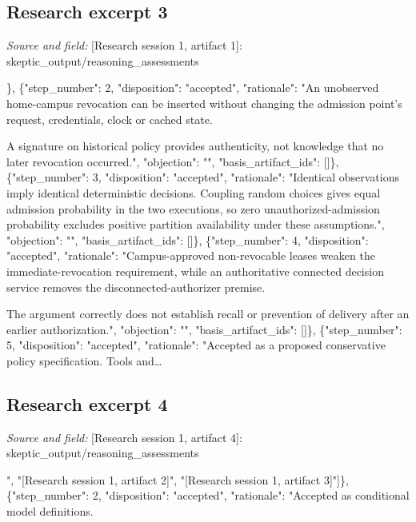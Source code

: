 \documentclass[11pt]{article}
\begin{document}
\subsection{Research excerpt 3}
\textit{Source and field: }[Research session 1, artifact 1]: skeptic\_output/reasoning\_assessments\par
[\{"step\_number": 1, "disposition": "accepted", "rationale": "Accepted as the exact conditional model, not as established university policy. It explicitly excludes alternative information channels and previously committed request-specific authorization, and defines safety and availability sufficiently for the argument.", "objection": "", "basis\_artifact\_ids": []\}, \{"step\_number": 2, "disposition": "accepted", "rationale": "An unobserved home-campus revocation can be inserted without changing the admission point's request, credentials, clock or cached state.

A signature on historical policy provides authenticity, not knowledge that no later revocation occurred.", "objection": "", "basis\_artifact\_ids": []\}, \{"step\_number": 3, "disposition": "accepted", "rationale": "Identical observations imply identical deterministic decisions. Coupling random choices gives equal admission probability in the two executions, so zero unauthorized-admission probability excludes positive partition availability under these assumptions.", "objection": "", "basis\_artifact\_ids": []\}, \{"step\_number": 4, "disposition": "accepted", "rationale": "Campus-approved non-revocable leases weaken the immediate-revocation requirement, while an authoritative connected decision service removes the disconnected-authorizer premise.

The argument correctly does not establish recall or prevention of delivery after an earlier authorization.", "objection": "", "basis\_artifact\_ids": []\}, \{"step\_number": 5, "disposition": "accepted", "rationale": "Accepted as a proposed conservative policy specification. Tools and\ldots{}

\subsection{Research excerpt 4}
\textit{Source and field: }[Research session 1, artifact 4]: skeptic\_output/reasoning\_assessments\par
[\{"step\_number": 1, "disposition": "accepted", "rationale": "The supplied prior extract identifies the stated policy and reservation gaps. Both peer extracts explicitly list liability-bound and complete-mediation premises. The step correctly treats these as unverified inputs and does not import the truncated economic argument.", "objection": "", "basis\_artifact\_ids": ["[Research session 1, artifact 1]", "[Research session 1, artifact 2]", "[Research session 1, artifact 3]"]\}, \{"step\_number": 2, "disposition": "accepted", "rationale": "Accepted as conditional model definitions.
\end{document}
